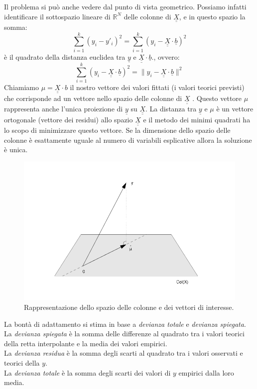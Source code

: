 \documentclass[]{article}
\def\doubleunderline#1{\underline{\underline{#1}}}
\begin{document}
Il problema si può anche vedere dal punto di vista geometrico. Possiamo infatti identificare il sottospazio lineare di $\mathbb{R}^N$ delle colonne di $\doubleunderline{X}$, e in questo spazio la somma:
\begin{equation}
\sum_{i=1}^k (y_i - y'_i)^2 = \sum_{i=1}^k (y_i - \doubleunderline{X} \cdot \underline{b})^2
\end{equation}
è il quadrato della distanza euclidea tra $\underline{y}$ e $\doubleunderline{X} \cdot \underline{b}$., ovvero:
\begin{equation}
\sum_{i=1}^k (y_i - \doubleunderline{X} \cdot \underline{b})^2 = \| y_i - \doubleunderline{X} \cdot \underline{b} \|^2
\end{equation}
Chiamiamo $\mu = \doubleunderline{X} \cdot b$ il nostro vettore dei valori fittati (i valori teorici previsti) che corrisponde ad un vettore nello spazio delle colonne di $\doubleunderline{X}$ . Questo vettore $\mu$ rappresenta anche l'unica proiezione di $\underline{y}$ su $\doubleunderline{X}$. La distanza tra $\underline{y}$ e $\mu$ è un vettore ortogonale (vettore dei residui) allo spazio $\doubleunderline{X}$ e il metodo dei minimi quadrati ha lo scopo di minimizzare questo vettore. Se la dimensione dello spazio delle colonne è esattamente uguale al numero di variabili esplicative allora la soluzione è unica.
\begin{figure}
\includegraphics[scale=0.4]{Immagini/spazio-col.png}
\caption{Rappresentazione dello spazio delle colonne e dei vettori di interesse.}
\end{figure}

La bontà di adattamento si stima in base a \textit{devianza totale} e
\textit{devianza spiegata}.\\
La \textit{devianza spiegata} è la somma delle differenze al quadrato tra i valori teorici della retta interpolante e la media dei valori empirici.\\
La \textit{devianza residua} è la somma degli scarti al quadrato tra i valori osservati e teorici della $y$. \\
La \textit{devianza totale} è la somma degli scarti dei valori di $y$ empirici dalla loro media.
\end{document}
